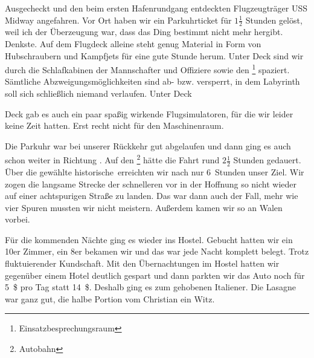 Ausgecheckt und den beim ersten Hafenrundgang entdeckten Flugzeugträger USS Midway angefahren.
Vor Ort haben wir ein Parkuhrticket für $1 \frac{1}{2}$ Stunden gelöst, weil ich der Über\-zeugung war, dass das Ding bestimmt nicht mehr hergibt.
Denkste.
Auf dem Flugdeck alleine steht genug Material in Form von Hubschraubern und Kampfjets für eine gute Stunde herum.
Unter Deck sind wir durch die Schlafkabinen der Mannschafter und Offiziere sowie den \footnote{Einsatzbesprechungsraum} spaziert.
Sämtliche Abzweigungsmöglichkeiten sind ab- bzw. versperrt, in dem Labyrinth soll sich schließlich niemand verlaufen.
Unter Deck 


\vspace*{.3\paperheight}

\noindent
Deck gab es auch ein paar spaßig wirkende Flugsimulatoren, für die wir leider keine Zeit hatten.
Erst recht nicht für den Maschinenraum.

Die Parkuhr war bei unserer Rückkehr gut abgelaufen und dann ging es auch schon weiter in Richtung .
Auf den \footnote{Autobahn} hätte die Fahrt rund $2 \frac{1}{2}$ Stunden gedauert.
Über die gewählte \glqq historische\grqq \,  erreichten wir nach nur 6~Stunden unser Ziel.
Wir zogen die langsame Strecke der schnelleren vor in der Hoffnung so nicht wieder auf einer achtspurigen Straße zu landen.
Das war dann auch der Fall, mehr wie vier Spuren mussten wir nicht meistern.
Außerdem kamen wir so an Walen vorbei.

Für die kommenden Nächte ging es wieder ins Hostel.
Gebucht hatten wir ein 10er Zimmer, ein 8er bekamen wir und das war jede Nacht komplett belegt.
Trotz fluktuierender Kundschaft.
Mit den Übernachtungen im Hostel hatten wir gegenüber einem Hotel deutlich gespart und dann parkten wir das Auto noch für 5~\$ pro Tag statt 14~\$.
Deshalb ging es zum gehobenen Italiener.
Die Lasagne war ganz gut, die halbe Portion vom Christian ein Witz.
